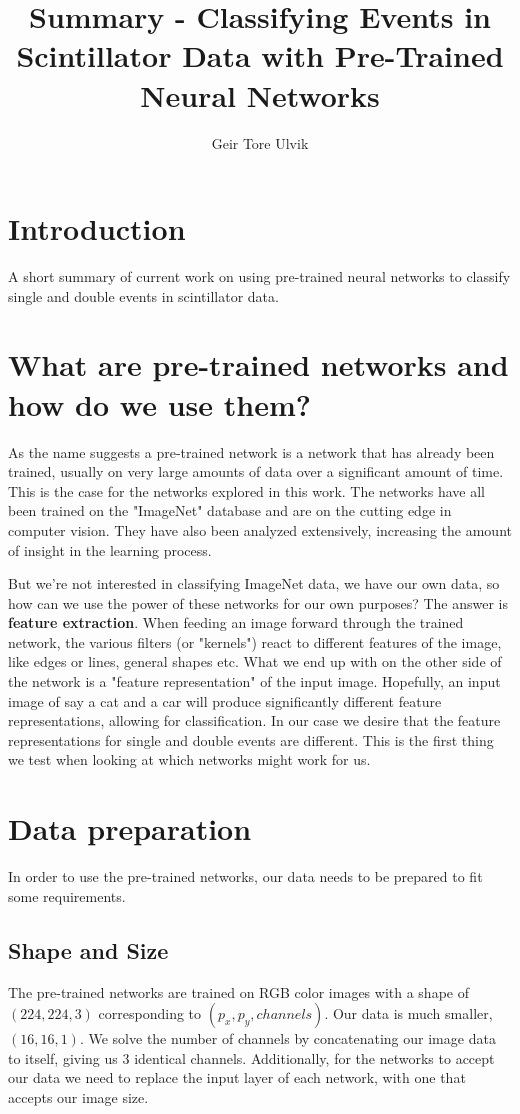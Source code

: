\documentclass[12pt, notitlepage]{article}
\begin{document}
\title{Summary - Classifying Events in Scintillator Data with Pre-Trained Neural Networks}
\author{Geir Tore Ulvik}
\maketitle
\section{Introduction}
A short summary of current work on using pre-trained neural networks to classify
single and double events in scintillator data.

\section{What are pre-trained networks and how do we use them?}
As the name suggests a pre-trained network is a network that has already
been trained, usually on very large amounts of data over a significant amount
of time. This is the case for the networks explored in this work. The networks
have all been trained on the "ImageNet" database and are on the cutting edge in
computer vision. They have also been analyzed extensively, increasing the amount
of insight in the learning process.

But we're not interested in classifying ImageNet data, we have our own data,
so how can we use the power of these networks for our own purposes?
The answer is \textbf{feature extraction}. When feeding an image forward
through the trained network, the various filters (or "kernels") react to different features
of the image, like edges or lines, general shapes etc. What we end up with on the other side
of the network is a "feature representation" of the input image. Hopefully, an input image
of say a cat and a car will produce significantly different feature representations, allowing
for classification. In our case we desire that the feature representations for single and
double events are different. This is the first thing we test when looking at which networks
might work for us.

\section{Data preparation}
In order to use the pre-trained networks, our data needs to be prepared to fit some requirements.
\subsection{Shape and Size}
The pre-trained networks are trained on RGB color images with a shape of $(224, 224, 3)$
corresponding to $(p_x, p_y, channels)$. Our data is much smaller, $(16, 16, 1)$. 
We solve the number of channels by concatenating our image data to itself, giving us 3 identical channels. 
Additionally, for the networks to accept our data we need to replace the input layer of each network,
with one that accepts our image size.
\end{document}
